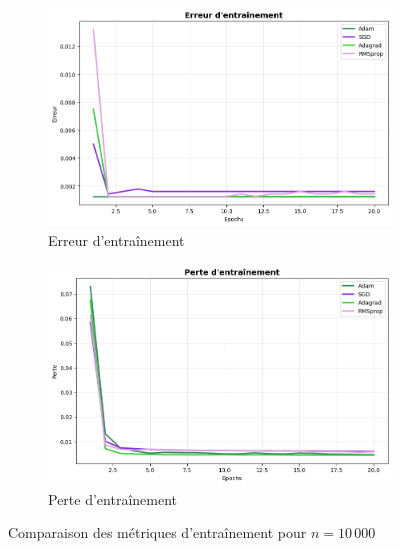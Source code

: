 \documentclass[a4paper,12pt]{article}
\begin{document}
\begin{figure}[H]
\centering
\begin{subfigure}[b]{0.48\textwidth}
    \includegraphics[width=\textwidth]{images/training_error_n10k.png}
    \caption[Erreur d'entraînement (n=10k)]{Erreur d'entraînement}
    \label{fig:training_10k}
\end{subfigure}
\hfill
\begin{subfigure}[b]{0.48\textwidth}
    \includegraphics[width=\textwidth]{images/training_loss_n10k.png}
    \caption[Perte d'entraînement (n=10k)]{Perte d'entraînement}
    \label{fig:loss_10k}
\end{subfigure}
\caption{Comparaison des métriques d'entraînement pour $n=10\,000$}
\label{fig:training_comparison}
\end{figure}
\end{document}
